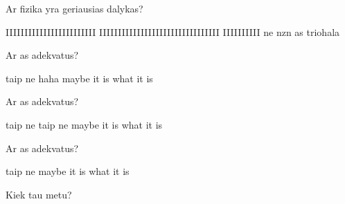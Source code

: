 \documentclass{exam}
\begin{document}
	\begin{questions}
		\raggedcolumns\begin{multicols}{2}
			\question Ar fizika yra geriausias dalykas? \begin{choices}
				\choice IIIIIIIIIIIIIIIIIIIIIIII \newline
				IIIIIIIIIIIIIIIIIIIIIIIIIIIIIIII \newline
				IIIIIIIIII
				\choice ne
				\choice nzn
				\choice as triohala
			\end{choices}
			\question Ar as adekvatus? \begin{choices}
				\choice taip
				\choice ne \newline \newline \newline haha
				\choice maybe
				\choice it is what it is
			\end{choices}
			\question Ar as adekvatus? \begin{choices}
				\choice taip \newline ne \newline taip
				\choice ne
				\choice maybe
				\choice it is what it is
			\end{choices}
			\question Ar as adekvatus? \begin{choices}
				\choice taip
				\choice ne
				\choice maybe
				\choice it is what it is
			\end{choices}
		\end{multicols}
		\question Kiek tau metu?
	\end{questions}
	
\end{document}
